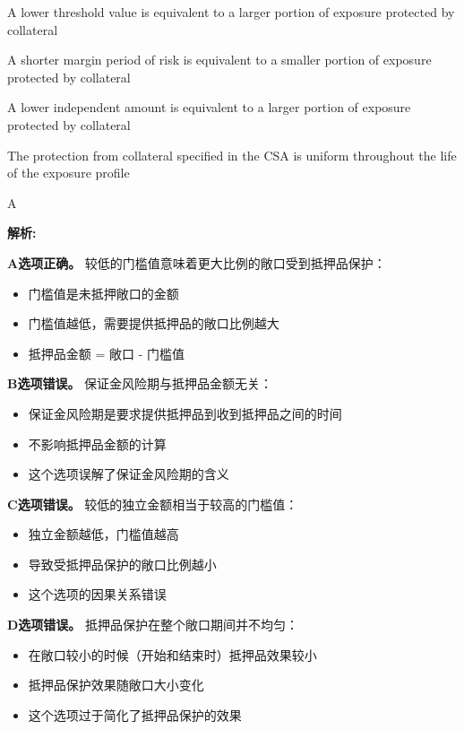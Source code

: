 \documentclass{article}
\newenvironment{explanation}
{\textbf{解析:}\par}
{\par}
\begin{document}
\begin{choices}
    \item A lower threshold value is equivalent to a larger portion of exposure protected by collateral
    \item A shorter margin period of risk is equivalent to a smaller portion of exposure protected by collateral
    \item A lower independent amount is equivalent to a larger portion of exposure protected by collateral
    \item The protection from collateral specified in the CSA is uniform throughout the life of the exposure profile
\end{choices}

\begin{correctanswer}
    A
\end{correctanswer}

\begin{explanation}
    \textbf{A选项正确。}
    较低的门槛值意味着更大比例的敞口受到抵押品保护：
    \begin{itemize}
        \item 门槛值是未抵押敞口的金额
        \item 门槛值越低，需要提供抵押品的敞口比例越大
        \item 抵押品金额 = 敞口 - 门槛值
    \end{itemize}

    \textbf{B选项错误。}
    保证金风险期与抵押品金额无关：
    \begin{itemize}
        \item 保证金风险期是要求提供抵押品到收到抵押品之间的时间
        \item 不影响抵押品金额的计算
        \item 这个选项误解了保证金风险期的含义
    \end{itemize}

    \textbf{C选项错误。}
    较低的独立金额相当于较高的门槛值：
    \begin{itemize}
        \item 独立金额越低，门槛值越高
        \item 导致受抵押品保护的敞口比例越小
        \item 这个选项的因果关系错误
    \end{itemize}

    \textbf{D选项错误。}
    抵押品保护在整个敞口期间并不均匀：
    \begin{itemize}
        \item 在敞口较小的时候（开始和结束时）抵押品效果较小
        \item 抵押品保护效果随敞口大小变化
        \item 这个选项过于简化了抵押品保护的效果
    \end{itemize}
\end{explanation}
\end{document}
